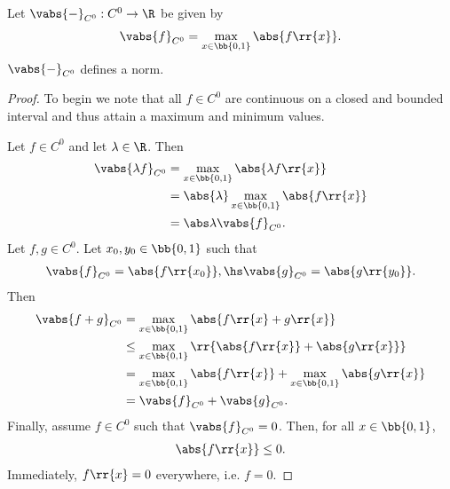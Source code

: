 \documentclass{article}
\begin{document}
\begin{claim*}[6]
	Let $\vabs{-}_{C^0}:C^0\to \R$ be given by
	\begin{align*}
		\vabs{f}_{C^0}=\max_{x\in \bb{ 0,1 }}\abs{f \rr{ x }}.
	\end{align*}
	$\vabs{-}_{C^0}$ defines a norm.
	\begin{proof}
		To begin we note that all $f\in C^0$ are continuous on a closed and bounded interval
		and thus attain a maximum and minimum values.

		Let $f\in C^0$ and let $\lambda\in\R$. Then
		\begin{align*}
			\vabs{\lambda f}_{C^0} & = \max_{x\in \bb{ 0,1 }}\abs{\lambda f \rr{ x }}       \\
			                       & = \abs{\lambda} \max_{x\in \bb{ 0,1 }}\abs{f \rr{ x }} \\
			                       & = \abs\lambda \vabs{f}_{C^0}.
		\end{align*}
		Let $f,g\in C^0$. Let $x_0,y_0\in \bb{ 0,1 }$ such that
		\begin{align*}
			\vabs{f}_{C^0} = \abs{f \rr{ x_0 }}, \hs \vabs{g}_{C^0} = \abs{g \rr{ y_0 }}.
		\end{align*}
		Then
		\begin{align*}
			\vabs{f + g}_{C^0} & = \max_{x\in \bb{ 0,1 }} \abs{ f \rr{ x } + g \rr{ x } }                                \\
			                   & \leq \max_{x\in \bb{ 0,1 }} \rr{ \abs{f \rr{ x }} + \abs{g \rr{ x } }}                  \\
			                   & = \max_{x\in \bb{ 0,1 }} \abs{ f \rr{ x } } + \max_{x\in \bb{ 0,1 }} \abs{ g \rr{ x } } \\
			                   & = \vabs{f}_{C^0} + \vabs{g}_{C^0}.
		\end{align*}
		Finally, assume $f\in C^0$ such that $\vabs{f}_{C^0}=0$. Then, for all $x\in \bb{ 0,1 }$,
		\begin{align*}
			\abs{f \rr{ x }} \leq 0.
		\end{align*}
		Immediately, $f \rr{ x }=0$ everywhere, i.e. $f=0$.
	\end{proof}
\end{claim*}
\end{document}
